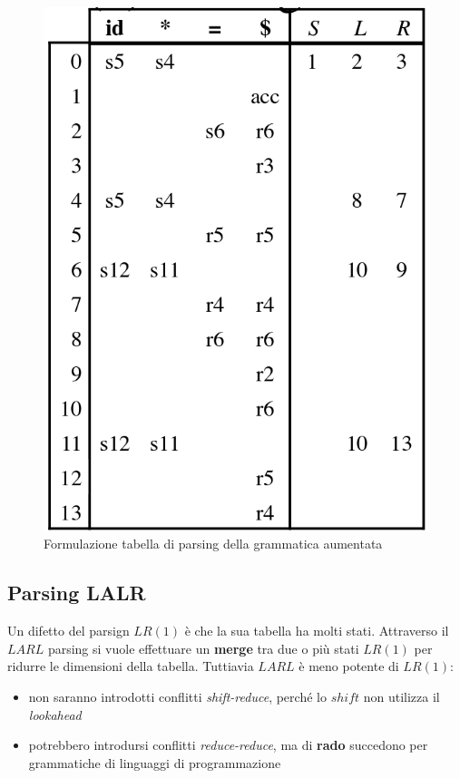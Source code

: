 \begin{figure}[H]
\centering
\includegraphics[scale=0.45]{res/image/ex_table}
\caption{Formulazione tabella di parsing della grammatica aumentata}
\label{fig:ex_table}
\end{figure}

\subsection{Parsing LALR}
\label{sec:parse_lalr}
Un difetto del parsign $LR(1)$ \`e che la sua tabella ha molti stati. Attraverso
il $LARL$ parsing si vuole effettuare un \textbf{merge} tra due o pi\`u stati
$LR(1)$ per ridurre le dimensioni della tabella. Tuttiavia $LARL$ \`e meno
potente di $LR(1)$:
\begin{itemize}
\item non saranno introdotti conflitti \textit{shift-reduce}, perch\'e lo
$shift$ non utilizza il \textit{lookahead}
\item potrebbero introdursi conflitti \textit{reduce-reduce}, ma di
\textbf{rado} succedono per grammatiche di linguaggi di programmazione
\end{itemize}

